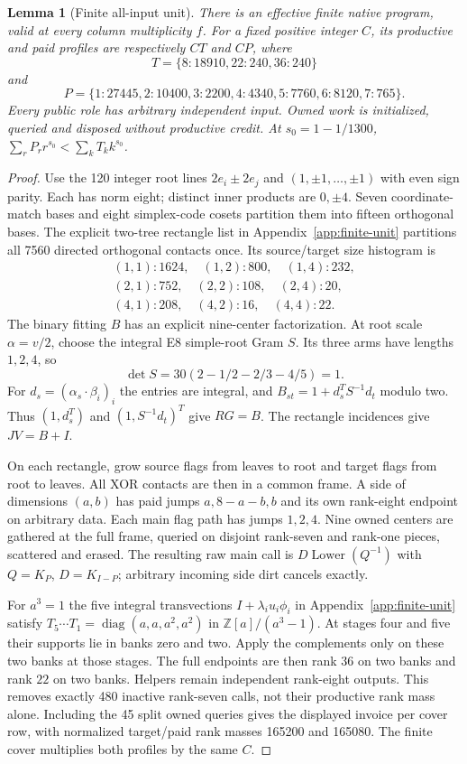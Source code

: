 \documentclass[11pt]{article}
\newtheorem{lemma}[theorem]{Lemma}
\begin{document}
\begin{lemma}[Finite all-input unit]\label{lem:unit}
There is an effective finite native program, valid at every column
multiplicity $f$. For a fixed positive integer $C$, its productive
and paid profiles are respectively $CT$ and $CP$, where
\[T=\{8:18910,22:240,36:240\}\]
and
\[P=\{1:27445,2:10400,3:2200,4:4340,5:7760,6:8120,7:765\}.
\]
Every public role has arbitrary independent input. Owned work is
initialized, queried and disposed without productive credit. At
$s_0=1-1/1300$, $\sum_rP_rr^{s_0}<\sum_kT_kk^{s_0}$.
\end{lemma}
\begin{proof}
Use the 120 integer root lines $2e_i\pm2e_j$ and
$(1,\pm1,\ldots,\pm1)$ with even sign parity. Each has norm eight;
distinct inner products are $0,\pm4$. Seven coordinate-match bases
and eight simplex-code cosets partition them into fifteen orthogonal
bases. The explicit two-tree rectangle list in Appendix~\ref{app:finite-unit} partitions
all 7560 directed orthogonal contacts once. Its source/target size
histogram is
\[\begin{gathered}
(1,1):1624,\quad (1,2):800,\quad (1,4):232,\\
(2,1):752,\quad (2,2):108,\quad (2,4):20,\\
(4,1):208,\quad (4,2):16,\quad (4,4):22.
\end{gathered}\]
The binary fitting $B$ has an explicit nine-center factorization. At
root scale $\alpha=v/2$, choose the integral E8 simple-root Gram $S$.
Its three arms have lengths $1,2,4$, so
\[\det S=30(2-1/2-2/3-4/5)=1.\]
For $d_s=(\alpha_s\cdot\beta_i)_i$ the entries are integral, and
$B_{st}=1+d_s^TS^{-1}d_t$ modulo two. Thus $(1,d_s^T)$ and
$(1,S^{-1}d_t)^T$ give $RG=B$. The rectangle incidences give $JV=B+I$.

On each rectangle, grow source flags from leaves to root and target
flags from root to leaves. All XOR contacts are then in a common frame.
A side of dimensions $(a,b)$ has paid jumps $a,8-a-b,b$ and its own
rank-eight endpoint on arbitrary data. Each main flag path has jumps
$1,2,4$. Nine owned centers are gathered at the full frame, queried on
disjoint rank-seven and rank-one pieces, scattered and erased. The
resulting raw main call is $D\operatorname{Lower}(Q^{-1})$ with
$Q=K_P$, $D=K_{I-P}$; arbitrary incoming side dirt cancels exactly.

For $a^3=1$ the five integral transvections
$I+\lambda_i u_i\phi_i$ in Appendix~\ref{app:finite-unit} satisfy
$T_5\cdots T_1=\operatorname{diag}(a,a,a^2,a^2)$ in
$\mathbb Z[a]/(a^3-1)$. At stages four and five their supports lie in
banks zero and two. Apply the complements only on these two banks at
those stages. The full endpoints are then rank $36$ on two banks and
rank $22$ on two banks. Helpers remain independent rank-eight outputs.
This removes exactly 480 inactive rank-seven calls, not their productive
rank mass alone. Including the 45 split owned queries gives the displayed
invoice per cover row, with normalized target/paid rank masses 165200
and 165080. The finite cover multiplies both profiles by the same $C$.


\end{proof}
\end{document}
